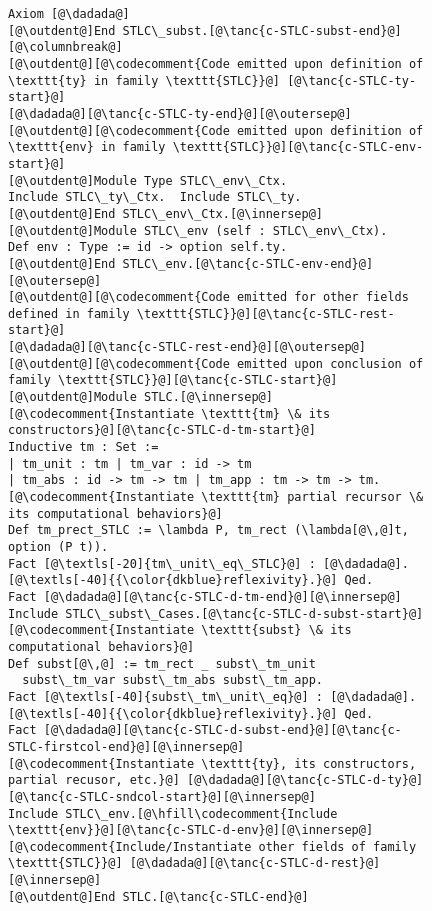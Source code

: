 \begin{figure}
\begin{minipage}{\textwidth}
\begin{multicols}{2}
\begin{lstlisting}
Axiom [@\dadada@]
[@\outdent@]End STLC\_subst.[@\tanc{c-STLC-subst-end}@][@\columnbreak@]
[@\outdent@][@\codecomment{Code emitted upon definition of \texttt{ty} in family \texttt{STLC}}@] [@\tanc{c-STLC-ty-start}@]
[@\dadada@][@\tanc{c-STLC-ty-end}@][@\outersep@]
[@\outdent@][@\codecomment{Code emitted upon definition of \texttt{env} in family \texttt{STLC}}@][@\tanc{c-STLC-env-start}@]
[@\outdent@]Module Type STLC\_env\_Ctx.
Include STLC\_ty\_Ctx.  Include STLC\_ty.
[@\outdent@]End STLC\_env\_Ctx.[@\innersep@]
[@\outdent@]Module STLC\_env (self : STLC\_env\_Ctx).
Def env : Type := id -> option self.ty.
[@\outdent@]End STLC\_env.[@\tanc{c-STLC-env-end}@][@\outersep@]
[@\outdent@][@\codecomment{Code emitted for other fields defined in family \texttt{STLC}}@][@\tanc{c-STLC-rest-start}@]
[@\dadada@][@\tanc{c-STLC-rest-end}@][@\outersep@]
[@\outdent@][@\codecomment{Code emitted upon conclusion of family \texttt{STLC}}@][@\tanc{c-STLC-start}@]
[@\outdent@]Module STLC.[@\innersep@]
[@\codecomment{Instantiate \texttt{tm} \& its constructors}@][@\tanc{c-STLC-d-tm-start}@]
Inductive tm : Set :=
| tm_unit : tm | tm_var : id -> tm
| tm_abs : id -> tm -> tm | tm_app : tm -> tm -> tm.
[@\codecomment{Instantiate \texttt{tm} partial recursor \& its computational behaviors}@]
Def tm_prect_STLC := \lambda P, tm_rect (\lambda[@\,@]t, option (P t)).
Fact [@\textls[-20]{tm\_unit\_eq\_STLC}@] : [@\dadada@]. [@\textls[-40]{{\color{dkblue}reflexivity}.}@] Qed.
Fact [@\dadada@][@\tanc{c-STLC-d-tm-end}@][@\innersep@]
Include STLC\_subst\_Cases.[@\tanc{c-STLC-d-subst-start}@]
[@\codecomment{Instantiate \texttt{subst} \& its computational behaviors}@]
Def subst[@\,@] := tm_rect _ subst\_tm_unit
  subst\_tm_var subst\_tm_abs subst\_tm_app.
Fact [@\textls[-40]{subst\_tm\_unit\_eq}@] : [@\dadada@]. [@\textls[-40]{{\color{dkblue}reflexivity}.}@] Qed.
Fact [@\dadada@][@\tanc{c-STLC-d-subst-end}@][@\tanc{c-STLC-firstcol-end}@][@\innersep@]
[@\codecomment{Instantiate \texttt{ty}, its constructors, partial recusor, etc.}@] [@\dadada@][@\tanc{c-STLC-d-ty}@][@\tanc{c-STLC-sndcol-start}@][@\innersep@]
Include STLC\_env.[@\hfill\codecomment{Include \texttt{env}}@][@\tanc{c-STLC-d-env}@][@\innersep@]
[@\codecomment{Include/Instantiate other fields of family \texttt{STLC}}@] [@\dadada@][@\tanc{c-STLC-d-rest}@][@\innersep@]
[@\outdent@]End STLC.[@\tanc{c-STLC-end}@]
\end{lstlisting}


\end{multicols}
\end{minipage}
\end{figure}
